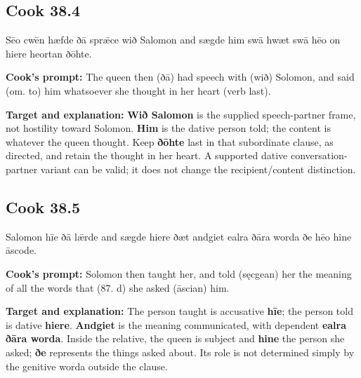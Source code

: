\par\begin{minipage}{\linewidth}\raggedright
\subsection*{Cook 38.4}

Sēo cwēn hæfde ðā sprǣce wið Salomon and sægde him swā hwæt swā hēo on hiere heortan ðōhte.

\textbf{Cook's prompt:} The queen then (ðā) had speech with (wið) Solomon, and said (om. to) him whatsoever she thought in her heart (verb last).

\textbf{Target and explanation:} \textbf{Wið Salomon} is the supplied speech-partner frame, not hostility toward Solomon. \textbf{Him} is the dative person told; the content is whatever the queen thought. Keep \textbf{ðōhte} last in that subordinate clause, as directed, and retain the thought in her heart. A supported dative conversation-partner variant can be valid; it does not change the recipient/\allowbreak{}content distinction.

\end{minipage}\par\addvspace{4pt}

\par\begin{minipage}{\linewidth}\raggedright
\subsection*{Cook 38.5}

Salomon hīe ðā lǣrde and sægde hiere ðæt andgiet ealra ðāra worda ðe hēo hine āscode.

\textbf{Cook's prompt:} Solomon then taught her, and told (sęcgean) her the meaning of all the words that (87. d) she asked (āscian) him.

\textbf{Target and explanation:} The person taught is accusative \textbf{hīe}; the person told is dative \textbf{hiere}. \textbf{Andgiet} is the meaning communicated, with dependent \textbf{ealra ðāra worda}. Inside the relative, the queen is subject and \textbf{hine} the person she asked; \textbf{ðe} represents the things asked about. Its role is not determined simply by the genitive worda outside the clause.

\end{minipage}\par\addvspace{4pt}

